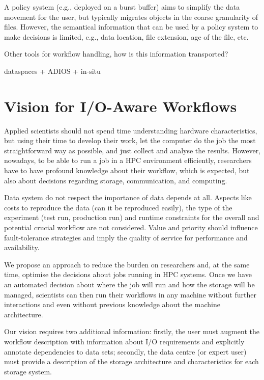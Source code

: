 \documentclass[a4paper]{article}
\newcommand{\jk}[1]{\todo[inline]{JK: #1}}
\begin{document}
A policy system (e.g., deployed on a burst buffer) aims to simplify the data movement for the user, but typically migrates objects in the coarse granularity of files.
However, the semantical information that can be used by a policy system to make decisions is limited, e.g., data location, file extension, age of the file, etc.

Other tools for workflow handling, how is this information transported?

dataspaces + ADIOS + in-situ

\jk{TODO}

\cite{Vladimirov2014FileIO}


\section{Vision for I/O-Aware Workflows}

Applied scientists should not spend time understanding hardware characteristics, but using their time to develop their work, let the computer do the job the most straightforward way as possible, and just collect and analyse the results.
However, nowadays, to be able to run a job in a HPC environment efficiently, researchers have to have profound knowledge about their workflow, which is expected, but also about decisions regarding storage, communication, and computing.

Data system do not respect the importance of data depends at all. Aspects like costs to reproduce the data (can it be reproduced easily), the type of the experiment (test run, production run) and runtime constraints for the overall and potential crucial workflow are not considered.
Value and priority should influence fault-tolerance strategies and imply the quality of service for performance and availability.

We propose an approach to reduce the burden on researchers and, at the same time, optimise the decisions about jobs running in HPC systems.
Once we have an automated decision about where the job will run and how the storage will be managed, scientists can then run their workflows in any machine without further interactions and even without previous knowledge about the machine architecture.

Our vision requires two additional information: firstly, the user must augment the workflow description with information about I/O requirements and explicitly annotate dependencies to data sets; secondly, the data centre (or expert user) must provide a description of the storage architecture and characteristics for each storage system.
\end{document}
